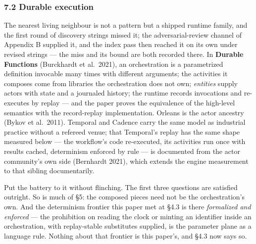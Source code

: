 \documentclass[
]{article}
\begin{document}
\subsubsection{7.2 Durable execution}\label{durable-execution}

The nearest living neighbour is not a pattern but a shipped runtime
family, and the first round of discovery strings missed it; the
adversarial-review channel of Appendix B supplied it, and the index pass
then reached it on its own under revised strings --- the miss and its
bound are both recorded there. In \textbf{Durable Functions} (Burckhardt
et al.~2021), an orchestration is a parametrized definition invocable
many times with different arguments; the activities it composes come
from libraries the orchestration does not own; \emph{entities} supply
actors with state and a journaled history; the runtime records
invocations and re-executes by replay --- and the paper proves the
equivalence of the high-level semantics with the record-replay
implementation. Orleans is the actor ancestry (Bykov et al.~2011).
Temporal and Cadence carry the same model as industrial practice without
a refereed venue; that Temporal's replay has the same shape measured
below --- the workflow's code re-executed, its activities run once with
results cached, determinism enforced by rule --- is documented from the
actor community's own side (Bernhardt 2021), which extends the engine
measurement to that sibling documentarily.

Put the battery to it without flinching. The first three questions are
satisfied outright. So is much of §5: the composed pieces need not be
the orchestration's own. And the determinism frontier this paper met at
§4.3 is there \emph{formalized and enforced} --- the prohibition on
reading the clock or minting an identifier inside an orchestration, with
replay-stable substitutes supplied, is the parameter plane as a language
rule. Nothing about that frontier is this paper's, and §4.3 now says so.
\end{document}
